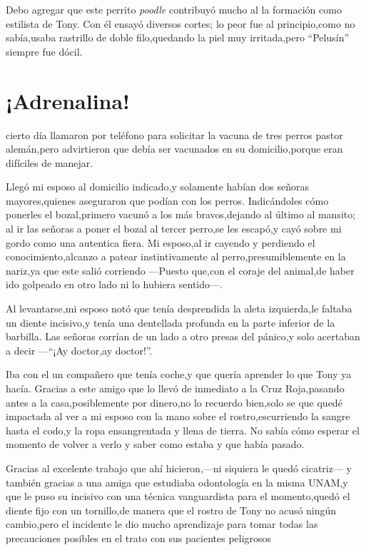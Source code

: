 \documentclass[letterpaper,12pt]{book}
\begin{document}
Debo agregar que este perrito \textit{poodle} contribuyó mucho  al la formación como estilista de Tony. Con él ensayó diversos cortes; lo peor fue al principio,como no sabía,usaba rastrillo de doble filo,quedando la piel muy irritada,pero ``Pelusín'' siempre fue dócil.

\chapter{¡Adrenalina!}
cierto día llamaron por teléfono para solicitar la vacuna de tres perros pastor alemán,pero advirtieron que debía ser vacunados en su domicilio,porque eran difíciles de manejar.

Llegó mi esposo al domicilio indicado,y solamente habían dos señoras mayores,quienes aseguraron que podían con los perros. Indicándoles cómo ponerles el bozal,primero vacunó a los más bravos,dejando al último al mansito; al ir las señoras a poner el bozal al tercer perro,se les escapó,y cayó sobre mi gordo como una autentica fiera. Mi esposo,al ir cayendo y perdiendo el conocimiento,alcanzo a patear instintivamente al perro,presumiblemente en la nariz,ya que este salió corriendo ---Puesto que,con el coraje del animal,de haber ido golpeado en otro lado ni lo hubiera sentido---. 

 Al levantarse,mi esposo notó que tenía desprendida la aleta izquierda,le faltaba un diente incisivo,y tenía una dentellada profunda en la parte inferior de la barbilla. Las señoras corrían de un lado a otro presas del pánico,y solo acertaban a decir ---``¡Ay doctor,ay doctor!''.

Iba con el un compañero que tenía coche,y que quería aprender lo que Tony ya hacía. Gracias a este amigo que lo llevó de inmediato a la Cruz Roja,pasando antes a la casa,posiblemente por dinero,no lo recuerdo bien,solo se que quedé impactada al ver a mi esposo con la mano sobre el rostro,escurriendo la sangre hasta el codo,y la ropa ensangrentada y llena de tierra.
No sabía cómo esperar el momento de volver a verlo y saber como estaba y que había pasado.

Gracias al excelente trabajo que ahí hicieron,---ni siquiera le quedó cicatriz--- y también gracias a una amiga que estudiaba odontología en la misma UNAM,y que le puso su incisivo con una técnica vanguardista para el momento,quedó el diente fijo con un tornillo,de manera que el rostro de Tony no acusó ningún  cambio,pero el incidente le dio mucho aprendizaje para tomar todas las precauciones posibles en el trato con sus pacientes peligrosos
\end{document}

